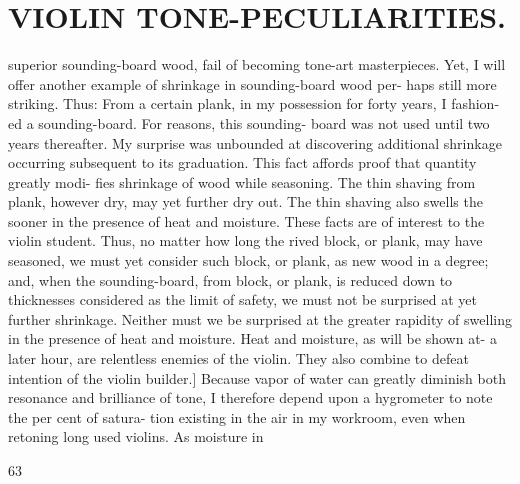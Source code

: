 \documentclass{article}
\begin{document}
\section*{VIOLIN TONE-PECULIARITIES.}
superior sounding-board wood, fail of becoming tone-art masterpieces. Yet, I will offer another example of shrinkage in sounding-board wood per- haps still more striking. Thus: From a certain plank, in my possession for forty years, I fashion- ed a sounding-board. For reasons, this sounding- board was not used until two years thereafter. My surprise was unbounded at discovering additional shrinkage occurring subsequent to its graduation. This fact affords proof that quantity greatly modi- fies shrinkage of wood while seasoning. The thin shaving from plank, however dry, may yet further dry out. The thin shaving also swells the sooner in the presence of heat and moisture. These facts are of interest to the violin student. Thus, no matter how long the rived block, or plank, may have seasoned, we must yet consider such block, or plank, as new wood in a degree; and, when the sounding-board, from block, or plank, is reduced down to thicknesses considered as the limit of safety, we must not be surprised at yet further shrinkage. Neither must we be surprised at the greater rapidity of swelling in the presence of heat and moisture. Heat and moisture, as will be shown at- a later hour, are relentless enemies of the violin. They also combine to defeat intention of the violin builder.] Because vapor of water can greatly diminish both resonance and brilliance of tone, I therefore depend upon a hygrometer to note the per cent of satura- tion existing in the air in my workroom, even when retoning long used violins. As moisture in

63
\end{document}
